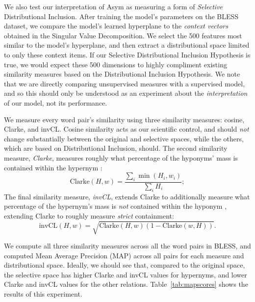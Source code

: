 \documentclass[12pt]{article}
\begin{document}
We also test our interpretation of Asym as measuring a form of {\em Selective}
Distributional Inclusion. After training the model's parameters on the BLESS
dataset, we compare the model's learned hyperplane to the {\em context
vectors} obtained in the Singular Value Decomposition. We select the 500
features most similar to the model's hyperplane, and then extract a
distributional space limited to only these context items. If our Selective
Distributional Inclusion Hypothesis is true, we would expect these 500
dimensions to highly compliment existing similarity measures based on the
Distributional Inclusion Hypothesis. We note that we are directly comparing
unsupervised measures with a supervised model, and so this should only be
understood as an experiment about the {\em interpretation} of our model, not
its performance.

We measure every word pair's similarity using three similarity measures:
cosine, Clarke, and invCL. Cosine similarity acts as our scientific control, and
should {\em not} change substantially between the
original and selective spaces, while the others, which are
based on Distributional Inclusion, should. The second similarity measure,
{\em Clarke}, measures roughly what percentage of the hyponyms' mass is contained
within the hypernym \cite{clarke:2009:gems}:
\begin{equation*}
  \text{Clarke}(H, w) = \frac{\sum_i \min(H_i, w_i)}{\sum_i H_i};
\end{equation*}
The final similarity measure, {\em invCL}, extends Clarke to additionally
measure what percentage of the hypernym's mass is {\em not} contained within
the hyponym \cite{lenci:2012:starsem}, extending Clarke to roughly measure
{\em strict} containment:
\begin{equation*}
  \text{invCL}(H, w) = \sqrt{\text{Clarke}(H, w)(1 - \text{Clarke}(w, H))}.
\end{equation*}

We compute all three similarity measures across all the word pairs in BLESS,
and computed Mean Average Precision (MAP) across all pairs for each measure
and distributional space. Ideally, we should see that, compared to the original
space, the selective space has higher Clarke and invCL values
for hypernyms, and lower Clarke and invCL values for the other relations.
Table~\ref{tab:mapscores} shows the results of this experiment.
\end{document}
